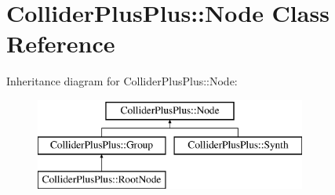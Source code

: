 \hypertarget{classColliderPlusPlus_1_1Node}{\section{Collider\-Plus\-Plus\-:\-:Node Class Reference}
\label{classColliderPlusPlus_1_1Node}
}
Inheritance diagram for Collider\-Plus\-Plus\-:\-:Node\-:\begin{figure}[H]
\begin{center}
\leavevmode
\includegraphics[height=3.000000cm]{classColliderPlusPlus_1_1Node}
\end{center}
\end{figure}
